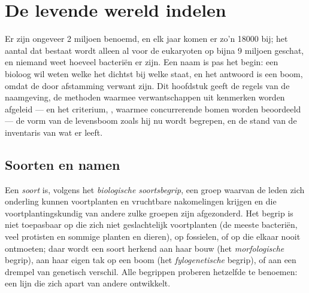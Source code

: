 \chapter{De levende wereld indelen}\label{ch:b1:classifying-biodiversity}

Er zijn ongeveer \num{2} miljoen  benoemd, en elk jaar komen er zo'n
\num{18000} bij; het aantal dat bestaat wordt alleen al voor de eukaryoten op
bijna \num{9} miljoen geschat, en niemand weet hoeveel bacteriën er zijn. Een
naam is pas het begin: een bioloog wil weten welke  het dichtst bij welke
staat, en het antwoord is een boom, omdat de  door afstamming verwant
zijn. Dit hoofdstuk geeft de regels van de naamgeving, de methoden waarmee
verwantschappen uit kenmerken worden afgeleid --- en het criterium,
, waarmee concurrerende bomen worden beoordeeld --- de vorm van
de levensboom zoals hij nu wordt begrepen, en de stand van de inventaris van
wat er leeft.

\section{Soorten en namen}

\begin{definition}[Soort]\label{def:b1:classifying-biodiversity:species}
Een \emph{soort} is, volgens het \emph{biologische soortsbegrip}, een groep
 waarvan de leden zich onderling kunnen voortplanten en vruchtbare
nakomelingen krijgen en die voortplantingskundig van andere zulke groepen
zijn afgezonderd. Het begrip is niet toepasbaar op  die zich niet
geslachtelijk voortplanten (de meeste bacteriën, veel protisten en sommige
planten en dieren), op fossielen, of op  die elkaar nooit
ontmoeten; daar wordt een soort herkend aan haar bouw (het
\emph{morfologische} begrip), aan haar eigen tak op een boom (het
\emph{fylogenetische} begrip), of aan een drempel van genetisch verschil. Alle
begrippen proberen hetzelfde te benoemen: een lijn die zich apart van andere
ontwikkelt.
\end{definition}

